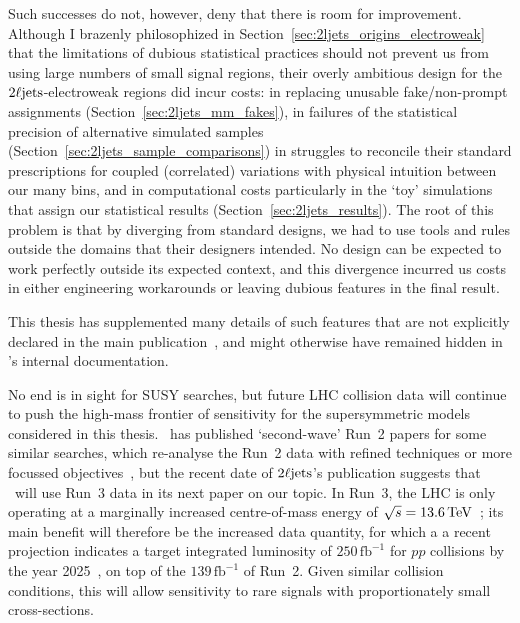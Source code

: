 Such successes do not, however, deny that there is room for improvement.
Although I brazenly philosophized in
Section~\ref{sec:2ljets_origins_electroweak} that the limitations of dubious
statistical practices should not prevent us from using large numbers of small
signal regions, their overly ambitious design for the $\twoljets$-electroweak
regions did incur costs:
in replacing unusable fake/non-prompt assignments
(Section~\ref{sec:2ljets_mm_fakes}),
in failures of the statistical precision of alternative simulated samples
(Section~\ref{sec:2ljets_sample_comparisons})
in struggles to reconcile their standard prescriptions for coupled
(correlated) variations with physical intuition between our many bins,
and in computational costs particularly in the `toy' simulations that assign
our statistical results (Section~\ref{sec:2ljets_results}).
The root of this problem is that by diverging from standard designs, we
had to use tools and rules outside the domains that their designers
intended.
No design can be expected to work perfectly outside its expected context,
and this divergence incurred us costs in either engineering workarounds or
leaving dubious features in the final result.

This thesis has supplemented many details of such features that are not
explicitly declared in the main publication~\cite{atlas2022searches},
and might otherwise have remained hidden in \atlas's internal documentation.


No end is in sight for SUSY searches, but future LHC collision data will
continue to push the high-mass frontier of sensitivity for the supersymmetric
models considered in this thesis.
\atlas\ has published `second-wave' Run~2 papers for some similar searches,
which re-analyse the Run~2 data with refined techniques or more focussed
objectives~\cite{
ATLAS:2022hbt,
ATLAS:2022nrb
},
but the recent date of $\twoljets$'s publication suggests that \atlas\ will
use Run~3 data in its next paper on our topic.
In Run~3, the LHC is only operating at a marginally increased centre-of-mass energy
of $\sqrt{s} = 13.6\,\eV[T]$~\cite{run3sqrts};
its main benefit will therefore be the increased data quantity,
for which a a recent projection indicates a target integrated luminosity of
$250\,\mathrm{fb}^{-1}$ for $pp$ collisions by the year
2025~\cite{run3luminosity},
on top of the $139\,\mathrm{fb}^{-1}$ of Run~2.
Given similar collision conditions, this will allow sensitivity to rare signals
with proportionately small cross-sections.

